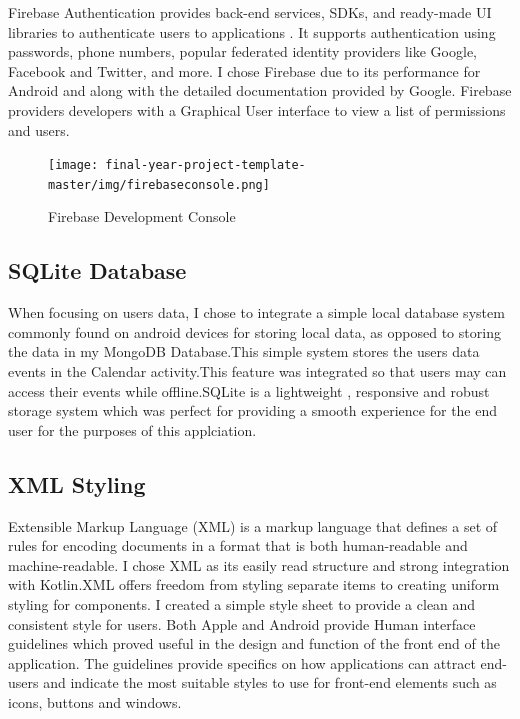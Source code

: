 Firebase Authentication provides back-end services,  SDKs, and ready-made UI libraries to authenticate users to applications \cite{firebaseauth}. It supports authentication using passwords, phone numbers, popular federated identity providers like Google, Facebook and Twitter, and more. I chose Firebase due to its  performance for Android and along with  the detailed documentation provided by Google. Firebase providers developers with a Graphical User interface to view a list of permissions and users.


\begin{figure}[H]
  \centering
    \texttt{[image: final-year-project-template-master/img/firebaseconsole.png]}
     \caption{Firebase Development Console}
\end{figure}




\subsection{SQLite Database }

When focusing on users data, I chose to integrate a simple local database system  commonly found on android devices for storing local data, as  opposed to storing
the data in my MongoDB Database.This  simple system stores the users data events in the Calendar activity.This feature was  integrated  so that  users may can access their events while offline.SQLite is a   lightweight , responsive and  robust storage system which was perfect for providing a smooth experience for the end user for the purposes of this applciation.


\subsection{XML Styling} 
Extensible Markup Language (XML) is a markup language that defines a set of rules for encoding documents in a format that is both human-readable and machine-readable. I chose XML  as its easily read structure and strong integration with Kotlin.XML offers  freedom from styling separate items to creating  uniform styling for components. I created a simple style sheet to provide a clean and consistent style for users. Both Apple and Android provide Human interface guidelines\cite{styleguidelines} which proved useful in the design and function of the front end of the application. The guidelines provide specifics on how applications can attract end-users and indicate the most suitable styles to use for front-end elements such as icons, buttons and windows.



